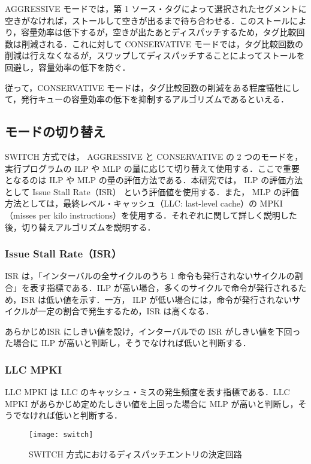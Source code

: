 AGGRESSIVE モードでは，第 1 ソース・タグによって選択されたセグメントに空きがなければ，ストールして空きが出るまで待ち合わせる．このストールにより，容量効率は低下するが，空きが出たあとディスパッチするため，タグ比較回数は削減される．これに対して CONSERVATIVE モードでは，タグ比較回数の削減は行えなくなるが，スワップしてディスパッチすることによってストールを回避し，容量効率の低下を防ぐ．

従って，CONSERVATIVE モードは，タグ比較回数の削減をある程度犠牲にして，発行キューの容量効率の低下を抑制するアルゴリズムであるといえる．

\subsection{モードの切り替え}
SWITCH 方式では， AGGRESSIVE と CONSERVATIVE の 2 つのモードを，実行プログラムの ILP や MLP の量に応じて切り替えて使用する．ここで重要となるのは ILP や MLP の量の評価方法である．本研究では， ILP の評価方法として Issue Stall Rate（ISR） という評価値を使用する．また， MLP の評価方法としては，最終レベル・キャッシュ（LLC: last-level cache）の MPKI（misses per kilo instructions）を使用する．それぞれに関して詳しく説明した後，切り替えアルゴリズムを説明する．

\subsubsection{Issue Stall Rate（ISR）}
ISR は，「インターバルの全サイクルのうち 1 命令も発行されないサイクルの割合」を表す指標である．ILP が高い場合，多くのサイクルで命令が発行されるため，ISR は低い値を示す．一方， ILP が低い場合には，命令が発行されないサイクルが一定の割合で発生するため，ISR は高くなる．

あらかじめISR にしきい値を設け，インターバルでの ISR がしきい値を下回った場合に ILP が高いと判断し，そうでなければ低いと判断する．

\subsubsection{LLC MPKI}
LLC MPKI は LLC のキャッシュ・ミスの発生頻度を表す指標である．LLC MPKI があらかじめ定めたしきい値を上回った場合に MLP が高いと判断し，そうでなければ低いと判断する．

\begin{figure}[htb]
  \centering
  \texttt{[image: switch]}
  \caption{SWITCH 方式におけるディスパッチエントリの決定回路}
  \label{fig:switch}
\end{figure}

